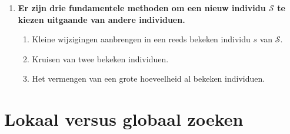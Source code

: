 \begin{itemize}
\begin{enumerate}
        \item \textbf{Er zijn drie fundamentele methoden om een nieuw individu $\mathcal{S}$ te kiezen uitgaande van andere individuen.}
        \begin{enumerate}
            \item Kleine wijzigingen aanbrengen in een reeds bekeken individu $s$ van $\mathcal{S}$.
            \item Kruisen van twee bekeken individuen. 
            \item Het vermengen van een grote hoeveelheid al bekeken individuen.
        \end{enumerate}
    \end{enumerate}
\end{itemize}


\section{Lokaal versus globaal zoeken}
